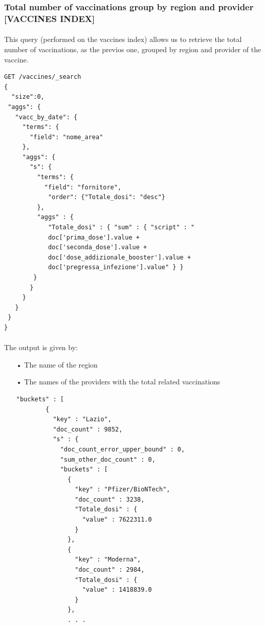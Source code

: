 \documentclass[a4paper,12pt]{article}
\begin{document}
\subsubsection{Total number of vaccinations group by region and provider [VACCINES INDEX]}
\paragraph{} This query (performed on the vaccines index) allows us to retrieve the total number of vaccinations, as the previos one, grouped by region and provider of the vaccine.
\begin{tcolorbox}[colback=green!5!white,colframe=green!75!black,title=QUERY]
\begin{verbatim}
GET /vaccines/_search
{
  "size":0,
 "aggs": {
   "vacc_by_date": {
     "terms": {
       "field": "nome_area"
     },
     "aggs": {
       "s": {
         "terms": {
           "field": "fornitore",
            "order": {"Totale_dosi": "desc"}
         },
         "aggs" : {
            "Totale_dosi" : { "sum" : { "script" : "
            doc['prima_dose'].value + 
            doc['seconda_dose'].value + 
            doc['dose_addizionale_booster'].value + 
            doc['pregressa_infezione'].value" } }
        }
       }
     }
   }
 }
}
\end{verbatim}
\end{tcolorbox}
\newpage

\paragraph{} The output is given by: 
\begin{itemize}[noitemsep]
\item[•] The name of the region
\item[•] The names of the providers with the total related vaccinations
\begin{tcolorbox}[colback=red!5!white,colframe=red!75!black,title=OUTPUT]
\begin{verbatim}
"buckets" : [
        {
          "key" : "Lazio",
          "doc_count" : 9852,
          "s" : {
            "doc_count_error_upper_bound" : 0,
            "sum_other_doc_count" : 0,
            "buckets" : [
              {
                "key" : "Pfizer/BioNTech",
                "doc_count" : 3238,
                "Totale_dosi" : {
                  "value" : 7622311.0
                }
              },
              {
                "key" : "Moderna",
                "doc_count" : 2984,
                "Totale_dosi" : {
                  "value" : 1418839.0
                }
              },
              . . .
\end{verbatim}
\end{tcolorbox}
\end{itemize}
\newpage
\end{document}
